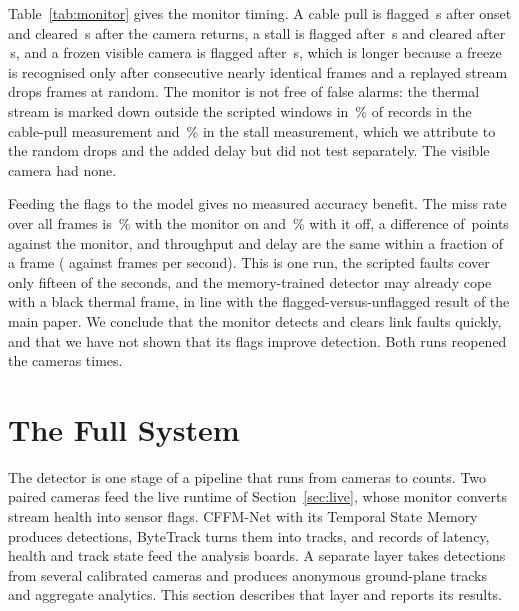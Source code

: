 Table~\ref{tab:monitor} gives the monitor timing. A cable pull is flagged \livFaultOnUnpluggedDetectS{}\,s after onset and cleared \livFaultOnUnpluggedRecoverS{}\,s after the camera returns, a stall is flagged after \livFaultOnStalledDetectS{}\,s and cleared after \livFaultOnStalledRecoverS{}\,s, and a frozen visible camera is flagged after \livFaultOnFrozenDetectS{}\,s, which is longer because a freeze is recognised only after consecutive nearly identical frames and a replayed stream drops frames at random. The monitor is not free of false alarms: the thermal stream is marked down outside the scripted windows in \livFaultOnUnpluggedFalseAlarmPercent{}\,\% of records in the cable-pull measurement and \livFaultOnStalledFalseAlarmPercent{}\,\% in the stall measurement, which we attribute to the random drops and the added delay but did not test separately. The visible camera had none.

Feeding the flags to the model gives no measured accuracy benefit. The miss rate over all frames is \livFaultOnMr{}\,\% with the monitor on and \livFaultOffMr{}\,\% with it off, a difference of \livFaultMrChange{}\,points against the monitor, and throughput and delay are the same within a fraction of a frame (\livFaultOnFps{} against \livFaultOffFps{} frames per second). This is one run, the scripted faults cover only fifteen of the \cfgLinkSeconds{} seconds, and the memory-trained detector may already cope with a black thermal frame, in line with the flagged-versus-unflagged result of the main paper. We conclude that the monitor detects and clears link faults quickly, and that we have not shown that its flags improve detection. Both runs reopened the cameras \livFaultOnReconnects{} times.


\section{The Full System}
\label{sec:system}
The detector is one stage of a pipeline that runs from cameras to counts. Two paired cameras feed the live runtime of Section~\ref{sec:live}, whose monitor converts stream health into sensor flags. CFFM-Net with its Temporal State Memory produces detections, ByteTrack turns them into tracks, and records of latency, health and track state feed the analysis boards. A separate layer takes detections from several calibrated cameras and produces anonymous ground-plane tracks and aggregate analytics. This section describes that layer and reports its results.

